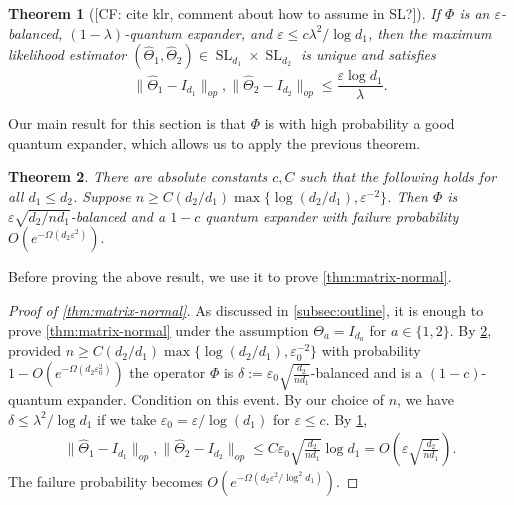 \documentclass{article}
\newtheorem{theorem}{Theorem}
\newcommand\eps{\varepsilon}
\newcommand\SL{\operatorname{SL}}
\newcommand{\CF}[1]{{\color{purple}[CF: #1]}}
\begin{document}
\begin{theorem}[\CF{cite klr, comment about how to assume in SL?}]\label{thm:klr}
If $\Phi$ is an $\eps$-balanced, $(1 - \lambda)$-quantum expander, and $\eps \leq c \lambda^2/\log d_1$, then the maximum likelihood estimator $(\widehat{\Theta}_1, \widehat{\Theta}_2) \in \SL_{d_1}\times \SL_{d_2}$ is unique and satisfies
$$\| \widehat{\Theta}_1 - I_{d_1}\|_{op}, \| \widehat{\Theta}_2 - I_{d_2}\|_{op} \leq \frac{\eps \log d_1}{\lambda}.$$
\end{theorem}
Our main result for this section is that $\Phi$ is with high probability a good quantum expander, which allows us to apply the previous theorem.

\begin{theorem}\label{thm:operator-cheeger}
There are absolute constants $c, C$ such that the following holds for all $d_1 \leq d_2$. Suppose $n \geq C (d_2/d_1) \max\{\log (d_2/d_1),  \eps^{-2}\} $. Then $\Phi$ is $\eps \sqrt{d_2/n d_1}$-balanced and a $1 - c$ quantum expander with failure probability $O(e^{ - \Omega( d_2 \eps^2)}).$
\end{theorem}

Before proving the above result, we use it to prove \cref{thm:matrix-normal}.

\begin{proof}[Proof of \cref{thm:matrix-normal}] As discussed in \cref{subsec:outline}, it is enough to prove \cref{thm:matrix-normal} under the assumption $\Theta_a = I_{d_a}$ for $a \in \{1,2\}$. By \cref{thm:operator-cheeger}, provided $n \geq C (d_2/d_1) \max\{\log (d_2/d_1),  \eps_0^{-2}\} $ with probability $1 - O(e^{ - \Omega( d_2 \eps_0^2)})$ the operator $\Phi$ is $\delta:=\eps_0  \sqrt{\frac{d_2}{n d_1}}$-balanced and is a $(1 - c)$-quantum expander. Condition on this event. By our choice of $n$, we have $\delta \leq \lambda^2/\log d_1$ if we take $\eps_0 = \eps/\log(d_1)$ for $\eps \leq c$. By \cref{thm:klr},
\begin{gather*} \| \widehat{\Theta}_1 - I_{d_1}\|_{op}, \| \widehat{\Theta}_2 - I_{d_2}\|_{op} \leq C \eps_0 \sqrt{\frac{d_2}{n d_1}} \log d_1 = O\left(\eps \sqrt{\frac{d_2}{n d_1}}\right).\end{gather*}
The failure probability becomes $O(e^{ - \Omega( d_2 \eps^2/\log^2 d_1)})$.
\end{proof}




\end{document}
